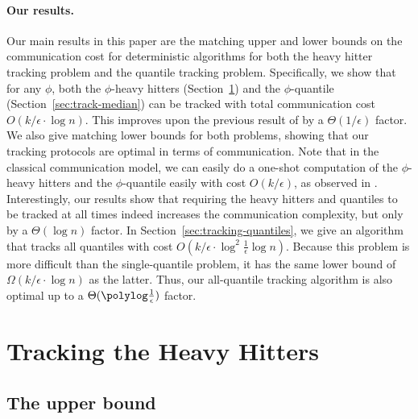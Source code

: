 \documentclass[10pt]{article}
\newcommand{\eps}{\epsilon}
\begin{document}
\paragraph{Our results.}
Our main results in this paper are the matching upper and lower bounds on
the communication cost for deterministic algorithms for both the heavy
hitter tracking problem and the quantile tracking problem.  Specifically,
we show that for any $\phi$, both the $\phi$-heavy hitters
(Section~\ref{sec:track-heavy-hitt}) and the $\phi$-quantile
(Section~\ref{sec:track-median}) can be tracked with total communication
cost $O(k/\eps \cdot \log n)$.  This improves upon the previous result of
\cite{Cormode:Garofalakis:Muthukrishnan:Rastogi:05} by a $\Theta(1/\eps)$
factor.  We also give matching lower bounds for both problems, showing that
our tracking protocols are optimal in terms of communication.  Note that in
the classical communication model, we can easily do a one-shot computation
of the $\phi$-heavy hitters and the $\phi$-quantile easily with cost
$O(k/\eps)$, as observed in
\cite{Cormode:Garofalakis:Muthukrishnan:Rastogi:05}.  Interestingly, our
results show that requiring the heavy hitters and quantiles to be tracked
at all times indeed increases the communication complexity, but only by a
$\Theta(\log n)$ factor.  In Section~\ref{sec:tracking-quantiles}, we give
an algorithm that tracks all quantiles with cost $O(k/\eps \cdot
\log^2\frac{1}{\eps}\log n)$.  Because this problem is more difficult than
the single-quantile problem, it has the same lower bound of $\Omega(k/\eps
\cdot \log n)$ as the latter.  Thus, our all-quantile tracking algorithm is
also optimal up to a $\Theta(\polylog\frac{1}{\eps})$ factor.



\section{Tracking the Heavy Hitters}
\label{sec:track-heavy-hitt}



\subsection{The upper bound}
\label{sec:upper-bound}
\end{document}

